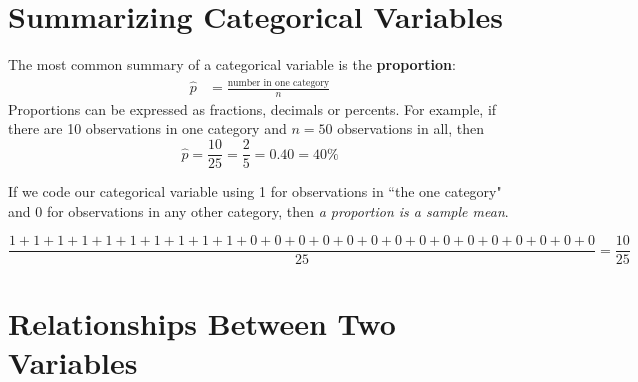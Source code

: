 \documentclass[twoside]{book}\usepackage[]{graphicx}\usepackage[]{xcolor}
\def\term#1{\textbf{#1}}
\newcounter{example}[section]
\begin{document}

\section{Summarizing Categorical Variables}

The most common summary of a categorical variable is the \term{proportion}:
\begin{align*}
\hat p & = \frac{\mbox{number in one category}}{n}
\end{align*}
Proportions can be expressed as fractions, decimals or percents.  
For example, if there are 
10 observations in one category and $n=50$ observations in all, then 
\[
\hat p = \frac{10}{25} = \frac{2}{5} =  0.40 = 40\%
\]

If we code our categorical variable using 1 for observations in ``the one category"
and 0 for observations in any other category, then
\emph{a proportion is a sample mean}.

\[
\frac{ 1 + 1 + 1 + 1 + 1 + 1 + 1 + 1 + 1 + 1 + 
0 + 0 + 0 + 0 + 0 + 0 + 0 + 0 + 0 + 0 + 0 + 0 + 0 + 0 + 0 }{25} = \frac{10}{25}
\]

\section{Relationships Between Two Variables}
\end{document}
